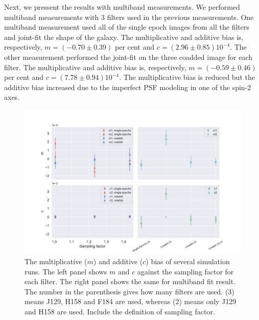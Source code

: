 \documentclass[fleqn,usenatbib]{mnras}
\begin{document}
Next, we pressent the results with multiband measurements. We performed multiband measurements with 3 filters used in the previous measurements. One multiband measurement used all of the single epoch images from all the filters and joint-fit the shape of the galaxy. The multiplicative and additive bias is, respectively, $m=(-0.70\pm0.39)$ per cent and $c=(2.96\pm0.85)10^{-4}$. The other measurement performed the joint-fit on the three coadded image for each filter. The multiplicative and additive bias is, respectively, $m=(-0.59\pm0.46)$ per cent and $c=(7.78\pm0.94)10^{-4}$. The multiplicative bias is reduced but the additive bias increased due to the imperfect PSF modeling in one of the spin-2 axes. 



\begin{figure}
	\includegraphics[width=\textwidth]{final_result.pdf}
    \caption{The multiplicative ($m$) and additive ($c$) bias of several simulation runs. The left panel shows $m$ and $c$ against the sampling factor for each filter. The right panel shows the same for multiband fit result. The number in the parenthesis gives how many filters are used. (3) means J129, H158 and F184 are used, whereas (2) means only J129 and H158 are used. Include the definition of sampling factor. }
    \label{fig:final_result}
\end{figure}
\end{document}
